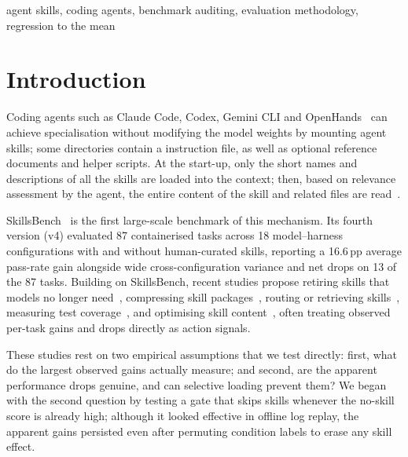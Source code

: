 \documentclass[10pt,conference]{IEEEtran}
\begin{document}
\begin{IEEEkeywords}
agent skills, coding agents, benchmark auditing, evaluation methodology, regression to the mean
\end{IEEEkeywords}

\section{Introduction}
Coding agents such as Claude Code, Codex, Gemini CLI and OpenHands~\cite{wang2025openhands} can achieve specialisation without modifying the model weights by mounting agent skills; some directories contain a  instruction file, as well as optional reference documents and helper scripts. At the start-up, only the short names and descriptions of all the skills are loaded into the context; then, based on relevance assessment by the agent, the entire content of the skill and related files are read~\cite{zhang2025skills}.

SkillsBench~\cite{li2026skillsbench} is the first large-scale benchmark of this mechanism. Its fourth version (v4) evaluated 87 containerised tasks across 18 model--harness configurations with and without human-curated skills, reporting a 16.6\,pp average pass-rate gain alongside wide cross-configuration variance and net drops on 13 of the 87 tasks. Building on SkillsBench, recent studies propose retiring skills that models no longer need~\cite{wang2026beyondgain}, compressing skill packages~\cite{gao2026skillreducer}, routing or retrieving skills~\cite{liu2026implicitrouting,sun2026skillrep}, measuring test coverage~\cite{tan2026skillcoverage}, and optimising skill content~\cite{ma2026skillneo}, often treating observed per-task gains and drops directly as action signals.

These studies rest on two empirical assumptions that we test directly: first, what do the largest observed gains actually measure; and second, are the apparent performance drops genuine, and can selective loading prevent them? We began with the second question by testing a gate that skips skills whenever the no-skill score is already high; although it looked effective in offline log replay, the apparent gains persisted even after permuting condition labels to erase any skill effect.
\end{document}
